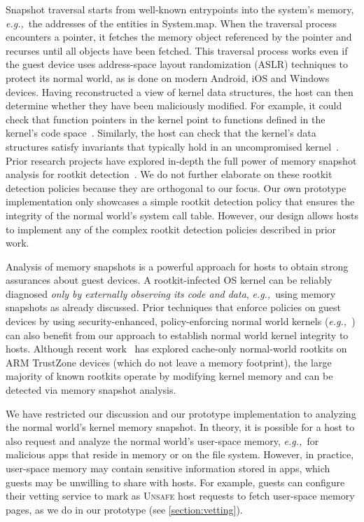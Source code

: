 \documentclass[pageno]{sig-alternate-05-2015}
\newcommand{\sectref}[1]{\autoref{#1}}
\newcommand{\eg}{\textit{e.g.,}}
\newcommand{\addtext}[2]{#2}
\begin{document}
Snapshot traversal starts from well-known entrypoints into the system's memory,
\eg~the addresses of the entities in \textsf{System.map}. When the traversal
process encounters a pointer, it fetches the memory object referenced by the
pointer and recurses until all objects have been fetched.  
\addtext{Task 13}{This traversal process works even if the guest device uses
address-space layout randomization (ASLR) techniques to protect its normal
world, as is done on modern Android, iOS and Windows devices.}
Having reconstructed a view of kernel data structures, the host can then
determine whether they have been maliciously modified. For example, it could
check that function pointers in the kernel point to functions defined in the
kernel's code space~\cite{sbcfi:ccs07}. Similarly, the host can check that the
kernel's data structures satisfy invariants that typically hold in an
uncompromised kernel~\cite{gib:tdsc11}.  
\addtext{Task 2}{Prior research projects have explored in-depth the full power
of memory snapshot analysis for rootkit
detection~\cite{sbcfi:ccs07,gib:tdsc11,kop:ccs09,kop:sec12,osck:asplos11}.  We
do not further elaborate on these rootkit detection policies because they are
orthogonal to our focus. Our own prototype implementation only showcases a
simple rootkit detection policy that ensures the integrity of the normal
world's system call table. However, our design allows hosts to implement any of
the complex rootkit detection policies described in prior work.}

Analysis of memory snapshots is a powerful approach for hosts to obtain strong
assurances about guest devices. A rootkit-infected OS kernel can be reliably
diagnosed \textit{only by externally observing its code and data}, \eg~using
memory snapshots as already discussed. Prior techniques that enforce policies
on guest devices by using security-enhanced, policy-enforcing normal world
kernels
(\eg~\cite{asm:sec14,flaskdroid:sec13,conxsense:asiaccs14,worlddriven:ccs14,blindspot:2009,markit:upside14,knox:mdm,ms:intune,blackberry:emm})
can also benefit from our approach to establish normal world kernel integrity
to hosts. 
\addtext{Task 15}{Although recent work~\cite{cachekit:eurosp16} has explored
cache-only normal-world rootkits on ARM TrustZone devices (which do not leave a
memory footprint), the large majority of known rootkits operate by modifying
kernel memory and can be detected via memory snapshot analysis.}

We have restricted our discussion and our prototype implementation to analyzing
the normal world's kernel memory snapshot. In theory, it is possible for a host
to also request and analyze the normal world's user-space memory, \eg~for
malicious apps that reside in memory or on the file system.  However, in
practice, user-space memory may contain sensitive information stored in apps,
which guests may be unwilling to share with hosts. For example, guests can
configure their vetting service to mark as \textsc{Unsafe} host requests to
fetch user-space memory pages, as we do in our prototype (see
\sectref{section:vetting}). 
\end{document}
